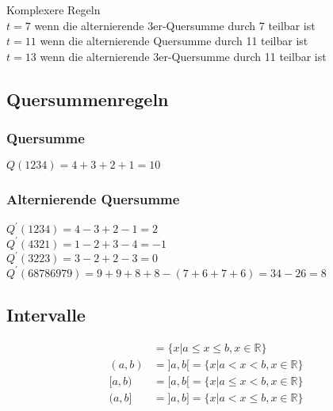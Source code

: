 Komplexere Regeln \\
$t=7$ wenn die alternierende 3er-Quersumme durch 7 teilbar ist\\
$t=11$ wenn die alternierende Quersumme durch 11 teilbar ist\\
$t=13$ wenn die alternierende 3er-Quersumme durch 11 teilbar ist


\subsection{Quersummenregeln}
\subsubsection{Quersumme}
$Q(1234)=4+3+2+1=10$

\subsubsection{Alternierende Quersumme}

$Q^{\prime}(1234)=4-3+2-1=2$\\
$Q^{\prime}(4321)=1-2+3-4=-1$\\
$Q^{\prime}(3223)=3-2+2-3=0$\\
$Q^{\prime}(68786979)=9+9+8+8-(7+6+7+6)=34-26=8$




\subsection{Intervalle}

\begin{align*}
[a,b]  &=  \{x| a \leq x \leq b, x \in \mathbb{R}\} \\
(a,b) &= ]a,b[ =  \{x| a <  x < b, x \in \mathbb{R}\} \\
[a,b) &= [a,b[ =  \{x| a \leq  x < b, x \in \mathbb{R}\} \\
(a,b] &= ]a,b] =  \{x| a <  x \leq b, x \in \mathbb{R}\}
\end{align*}